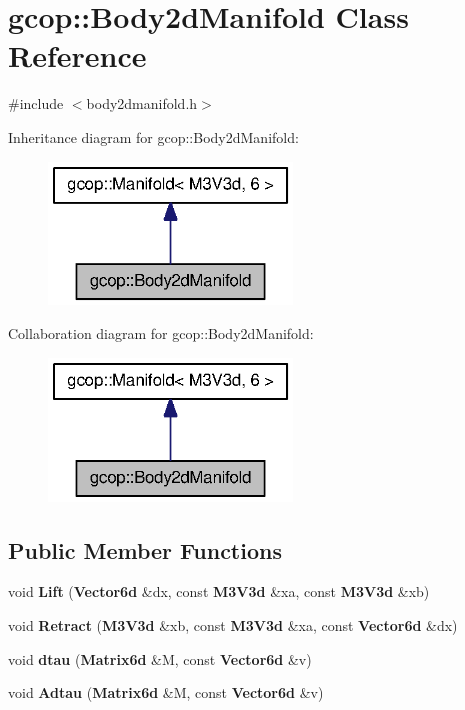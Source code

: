 \section{gcop\-:\-:\-Body2d\-Manifold \-Class \-Reference}
\label{classgcop_1_1Body2dManifold}


{\ttfamily \#include $<$body2dmanifold.\-h$>$}



\-Inheritance diagram for gcop\-:\-:\-Body2d\-Manifold\-:\nopagebreak
\begin{figure}[H]
\begin{center}
\leavevmode
\includegraphics[width=184pt]{classgcop_1_1Body2dManifold__inherit__graph}
\end{center}
\end{figure}


\-Collaboration diagram for gcop\-:\-:\-Body2d\-Manifold\-:\nopagebreak
\begin{figure}[H]
\begin{center}
\leavevmode
\includegraphics[width=184pt]{classgcop_1_1Body2dManifold__coll__graph}
\end{center}
\end{figure}
\subsection*{\-Public \-Member \-Functions}
\begin{DoxyCompactItemize}
\item 
void {\bf \-Lift} ({\bf \-Vector6d} \&dx, const {\bf \-M3\-V3d} \&xa, const {\bf \-M3\-V3d} \&xb)
\item 
void {\bf \-Retract} ({\bf \-M3\-V3d} \&xb, const {\bf \-M3\-V3d} \&xa, const {\bf \-Vector6d} \&dx)
\item 
void {\bf dtau} ({\bf \-Matrix6d} \&\-M, const {\bf \-Vector6d} \&v)
\item 
void {\bf \-Adtau} ({\bf \-Matrix6d} \&\-M, const {\bf \-Vector6d} \&v)
\end{DoxyCompactItemize}
